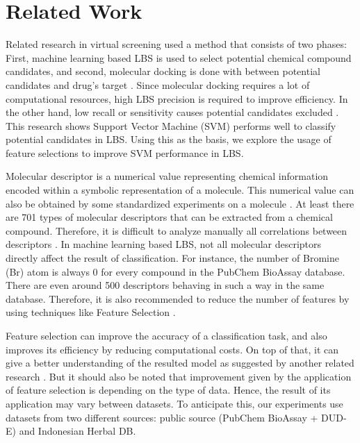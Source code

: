 \documentclass[conference]{IEEEtran}
\begin{document}
\section{Related Work}

Related research in virtual screening used a method that consists of two phases: First, machine learning based LBS is used to select potential chemical compound candidates, and second, molecular docking is done with between potential candidates and drug's target \cite{hilman2012analisis}. Since molecular docking requires a lot of computational resources, high LBS precision is required to improve efficiency. In the other hand, low recall or sensitivity causes potential candidates excluded \cite{korkmaz2014drug}. This research shows Support Vector Machine (SVM) performs well to classify potential candidates in LBS. Using this as the basis, we explore the usage of feature selections to improve SVM performance in LBS.

Molecular descriptor is a numerical value representing chemical information encoded within a symbolic representation of a molecule. This numerical value can also be obtained by some standardized experiments on a molecule \cite{yap2011padel}. At least there are 701 types of molecular descriptors that can be extracted from a chemical compound. Therefore, it is difficult to analyze manually all correlations between descriptors \cite{korkmaz2014drug}. In machine learning based LBS, not all molecular descriptors directly affect the result of classification. For instance, the number of Bromine (Br) atom is always 0 for every compound in the PubChem BioAssay database. There are even around 500 descriptors behaving in such a way in the same database. Therefore, it is also recommended to reduce the number of features by using techniques like Feature Selection \cite{korkmaz2014drug}.

Feature selection can improve the accuracy of a classification task, and also improves its efficiency by reducing computational costs. On top of that, it can give a better understanding of the resulted model as suggested by another related research \cite{janecek2008relationship}. But it should also be noted that improvement given by the application of feature selection is depending on the type of data. Hence, the result of its application may vary between datasets\cite{janecek2008relationship}. To anticipate this, our experiments use datasets from two different sources: public source (PubChem BioAssay + DUD-E) and Indonesian Herbal DB.
\end{document}
